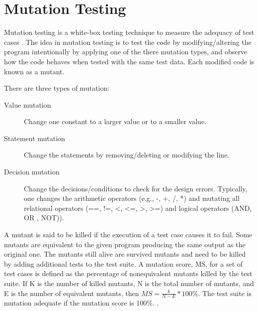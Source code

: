 \section{Mutation Testing}
Mutation testing is a white-box testing technique to measure the adequacy of test cases \autocite{demillo1978hints}. The idea in mutation testing is to test the code by modifying/altering the program intentionally by applying one of the there mutation types, and observe how the code behaves when tested with the same test data.  Each modified code is known as a mutant.

There are three types of mutation:
\begin{description}
    \item[Value mutation] Change one constant to a larger value or to a smaller value.
    \item[Statement mutation] Change the statements by removing/deleting or modifying the line.
    \item[Decision mutation] Change the decisions/conditions to check for the design errors. Typically, one changes the arithmetic operators (e.g., -, +, /, *) and mutating all relational operators (==, !=, <, <=, >, >=) and logical operators (AND, OR , NOT)).
\end{description}
A mutant is said to be killed if the execution of a test case causes it to fail. Some mutants are equivalent to the given program producing the same output as the original one. The mutants still alive are survived mutants and need to be killed by adding additional tests to the test suite. A mutation score, MS, for a set of test cases is defined as the percentage of nonequivalent mutants killed by the test suite. If K is the number of killed mutants, N is the total number of mutants, and E is the number of equivalent mutants, then $MS = \frac{k}{N - E} * 100\%$. The test suite is mutation adequate if the mutation score is 100\%. . 
